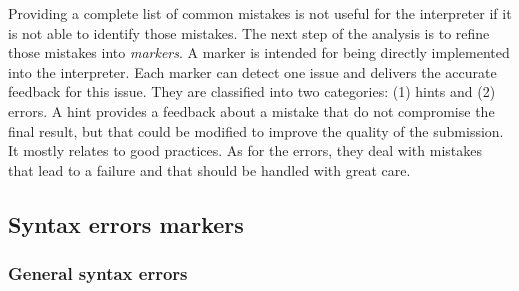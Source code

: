 \documentclass[11pt,a4paper,twoside,openright]{report}
\begin{document}
Providing a complete list of common mistakes is not useful for the interpreter 
if it is not able to identify those mistakes. The next step of the 
analysis is to refine those mistakes into \textit{markers}. A marker 
is intended for being directly implemented into the interpreter. Each marker 
can detect one issue and delivers the accurate feedback for this issue.
They are classified into two categories: (1) hints and (2) errors. A hint 
provides a feedback about a mistake that do not compromise the final result, 
but that could be modified to improve the quality of the submission. It
mostly relates to good practices. As for the errors, they deal with mistakes that 
lead to a failure and that should be handled with great care.

\subsection{Syntax errors markers}

\subsubsection{General syntax errors}
\end{document}
